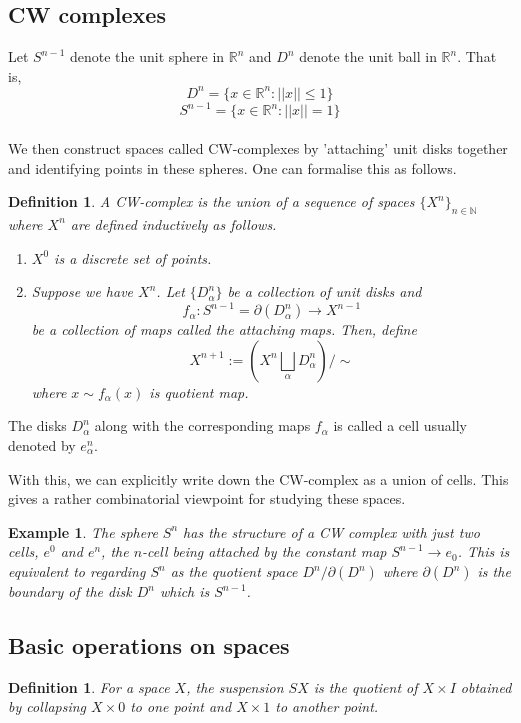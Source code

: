 \documentclass[12pt]{extarticle}
\numberwithin{equation}{section}
\newtheorem{defn}[thm]{Definition}
\newtheorem{exm}[thm]{Example}
\newcommand{\R}{\mathbb{R}}
\newcommand{\N}{\mathbb{N}}
\begin{document}
\subsection{CW complexes}
Let $S^{n-1}$ denote the unit sphere in $\R^n$ and $D^n$ denote the unit ball in $\R^n$. That is, $$D^n=\{x\in\R^n: ||x||\leq 1\}$$ 
$$S^{n-1}=\{x\in\R^n: ||x||= 1\}$$\\
We then construct spaces called CW-complexes by 'attaching' unit disks together and identifying points in these spheres. One can formalise this as follows.\\

\begin{defn}
A CW-complex is the union of a sequence of spaces $\{X^n\}_{n\in\N}$ where $X^n$ are defined inductively as follows.\\

\begin{enumerate}
    \item $X^0$ is a discrete set of points.
    \item Suppose we have $X^n$. Let $\{D_{\alpha}^n\}$ be a collection of unit disks and $$f_{\alpha}:S^{n-1}=\partial(D_\alpha^n)\to X^{n-1}$$ be a collection of maps called the attaching maps. Then, define $$X^{n+1}:=(X^n\bigsqcup_{\alpha}D_{\alpha}^n)/\sim $$ where $x\sim f_\alpha(x)$ is quotient map.
\end{enumerate}
\end{defn}

The disks $D_\alpha^n$ along with the corresponding maps $f_\alpha$ is called a cell usually denoted by $e^n_\alpha$.

With this, we can explicitly write down the CW-complex as a union of cells. This gives a rather combinatorial viewpoint for studying these spaces. 

\begin{exm}
The sphere $S^n$ has the structure of a CW complex with just two cells, $e^0$
and $e^n$, the $n$-cell being attached by the constant map $S^{n-1}\to e_0$. This is equivalent
to regarding $S^n$ as the quotient space $D^n/\partial(D^n)$ where $\partial(D^n)$ is the boundary of the disk $D^n$ which is $S^{n-1}$.
\end{exm}

\subsection{Basic operations on spaces}

\begin{defn}
For a space $X$, the suspension $SX$ is the quotient of $X\times I$ obtained by collapsing $X\times {0}$ to one point and $X\times{1}$ to another point.
\end{defn}
\end{document}
